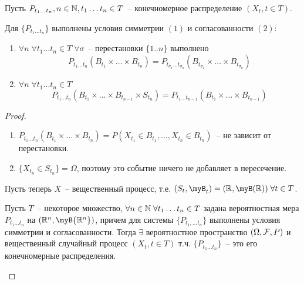 Пусть $P_{t_1 \dots t_n}, n \in \mathbb{N}, t_1 \dots t_n \in T$~-- конечномерное распределение $(X_t, t \in T)$.

\begin{lem}
Для $\{P_{t_1 \dots t_n}\}$ выполнены условия симметрии $(1)$ и согласованности $(2)$:
\begin{enumerate}
\item $\forall n \; \forall t_1 \dots t_n \in T \; \forall \sigma$~-- перестановки $\{1 .. n\}$ выполнено
$$P_{t_1 \dots t_n}(B_{t_1} \times \dots \times B_{t_n}) =
P_{t_{\sigma_1} \dots t_{\sigma_n}} (B_{t_{\sigma_1}} \times \dots \times B_{t_{\sigma_n}})
$$

\item $\forall n \; \forall t_1 \dots t_n \in T$
$$P_{t_1 \dots t_n}(B_{t_1} \times \dots \times B_{t_{n-1}} \times S_{t_n}) =
P_{t_1 \dots t_{n-1}}(B_{t_1} \times \dots \times B_{t_{n-1}})$$
\end{enumerate}

\begin{proof} \forcenewline
\begin{enumerate}
\item $P_{t_1 \dots t_n}(B_{t_1} \times \dots \times B_{t_n})
= P(X_{t_1} \in B_{t_1}, \dots, X_{t_n} \in B_{t_n})$~-- не зависит от перестановки.
\item $\{X_{t_n} \in S_{t_n}\} =  \Omega$, поэтому это событие ничего не добавляет в пересечение.
\end{enumerate}

Пусть теперь $X$~--  вещественный процесс, т.е. $(S_t, \myB_t) = (\myR, \myB(\myR)) \; \forall t \in T$.
\begin{theorem}
Пусть $T$~-- некоторое множество, $\forall n \in \mathbb{N} \; \forall t_1 \dots t_n \in T$ задана
вероятностная мера
$P_{t_1 \dots t_n}$ на $(\myR^n, \myB{\myR^n})$,
причем для системы $\{P_{t_1, \dots t_n}\}$  выполнены условия симметрии и согласованности.
Тогда $\exists$ вероятностное пространство $(\Omega, \mathcal{F}, P)$
и вещественный случайный процесс $(X_t, t \in T)$
т.ч. $\{P_{t_1 \dots t_n}\}$~-- это его конечномерные распределения.
\end{theorem}
\end{proof}
\end{lem}

